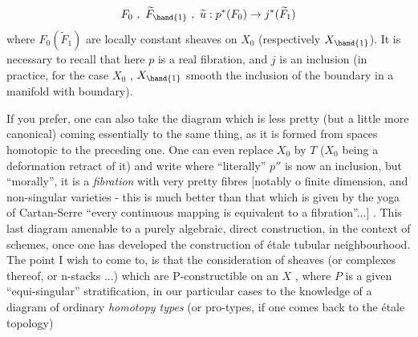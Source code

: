 \[ F_0 \ , \ \widetilde{F}_{\hand{1}} \ , \ \widetilde{u} : p^*(F_0) \to j^*(\widetilde{F}_1) \]
where $F_0(\widetilde{F}_1)$ are locally constant sheaves on $X_0$ (respectively $X_{\hand{1}}$).
It is necessary to recall that  here $p$ is a real fibration, and
$j$ is an inclusion (in practice, for the case $X_0$ , $X_{\hand{1}}$ smooth\hand{,} the
inclusion of the boundary in a manifold with boundary).

If you prefer, one can also take the diagram which is less pretty (but
a little more canonical)
coming essentially to the same thing, as it is formed from spaces homotopic
to the preceding one. One can even replace $X_0$ by $T$ ($X_0$ being a
deformation retract of it) and write
where ``literally'' $p''$ is now an inclusion, but ``morally'', it is a \textit{fibration}
with  very pretty fibres [notably  o finite dimension, and  
non-singular varieties - this is  much better than that which is given
by the yoga of Cartan-Serre ``every continuous mapping is equivalent to a
fibration''...] . This last diagram   amenable to a purely algebraic, direct
construction, in the context of schemes, once one has developed the
construction of étale tubular neighbourhood.
 The point I wish to come to, is that the consideration of sheaves
(or complexes thereof, or n-stacks ...) which are P-constructible on an $X$ ,
where $P$ is a given ``equi-singular'' stratification,   in our particular
cases to the knowledge of a diagram of ordinary \textit{homotopy types} (or pro-types,
if one comes back to the étale topology)

